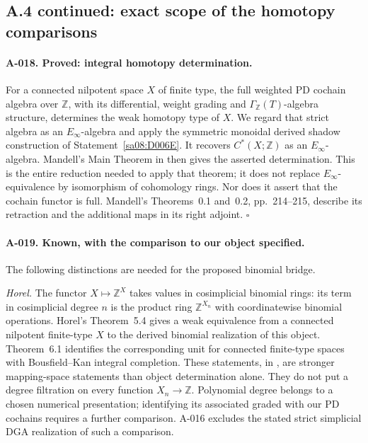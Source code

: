 \subsection{A.4 continued: exact scope of the homotopy comparisons}

\paragraph{A-018. Proved: integral homotopy determination.}
For a connected nilpotent space $X$ of finite type, the full weighted
PD cochain algebra over $\mathbb Z$, with its differential, weight
grading and $\Gamma_{\mathbb Z}(T)$-algebra structure, determines
the weak homotopy type of $X$. We regard that strict algebra as an
$E_\infty$-algebra and apply the symmetric monoidal derived shadow
construction of Statement~\ref{sa08:D006E}. It recovers
$C^*(X;\mathbb Z)$ as an $E_\infty$-algebra. Mandell's Main Theorem
in \cite[p.~213]{A_Mandell2006} then gives the asserted
determination. This is the entire reduction needed to apply that
theorem; it does not replace $E_\infty$-equivalence by isomorphism
of cohomology rings. Nor does it assert that the cochain functor is
full. Mandell's Theorems~0.1 and~0.2, pp.~214--215, describe its
retraction and the additional maps in its right adjoint.
\hfill$\square$

\paragraph{A-019. Known, with the comparison to our object specified.}
The following distinctions are needed for the proposed binomial
bridge.

\emph{Horel.}
The functor $X\mapsto\mathbb Z^X$ takes values in cosimplicial
binomial rings: its term in cosimplicial degree $n$ is the product
ring $\mathbb Z^{X_n}$ with coordinatewise binomial operations.
Horel's Theorem~5.4 gives a weak equivalence from a connected
nilpotent finite-type $X$ to the derived binomial realization of
this object. Theorem~6.1 identifies the corresponding unit for
connected finite-type spaces with Bousfield--Kan integral
completion. These statements, in \cite{A_Horel}, are stronger
mapping-space statements than object determination alone. They
do not put a degree filtration on every function $X_n\to\mathbb Z$.
Polynomial degree belongs to a chosen numerical presentation;
identifying its associated graded with our PD cochains requires a
further comparison. A-016 excludes the stated strict simplicial
DGA realization of such a comparison.

